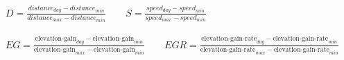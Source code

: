 $
D = \frac {distance_{day} - distance_{min}} {distance_{max} - distance_{min}}
\qquad
S = \frac {speed_{day} - speed_{min}} {speed_{max} - speed_{min}}
$
\\ \\
$
EG = \frac {\text{elevation-gain}_{day} - \text{elevation-gain}_{min}} {\text{elevation-gain}_{max} - \text{elevation-gain}_{min}}
\qquad
EGR = \frac {\text{elevation-gain-rate}_{day} - \text{elevation-gain-rate}_{min}} {\text{elevation-gain-rate}_{max} - \text{elevation-gain-rate}_{min}}
$
